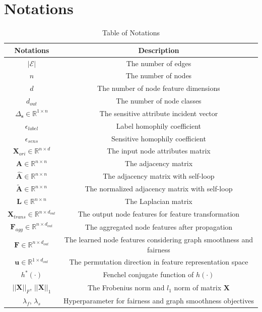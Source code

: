 \documentclass[letterpaper]{article} %
\theoremstyle{plain}
\theoremstyle{definition}
\theoremstyle{remark}
\begin{document}
\section{Notations}
\begin{table}[h]
\caption{Table of Notations}
\centering
    \begin{tabular}{ cc} 
    \toprule
    Notations & Description \\
    \hline
    $|\mathcal{E}|$ & The number of edges \\
    $n$ & The number of nodes\\
    $d$ & The number of node feature dimensions\\
    $d_{out}$ & The number of node classes\\
    $\Delta_{\mathbf{s}}\in\mathbb{R}^{1\times n}$ & The sensitive attribute incident vector \\
    $\epsilon_{label}$ & Label homophily coefficient \\
    $\epsilon_{sens}$ & Sensitive homophily coefficient \\
    $\mathbf{X}_{ori}\in\mathbb{R}^{n\times d}$ & The input node attributes matrix \\
    $\mathbf{A}\in\mathbb{R}^{n\times n}$ & The adjacency matrix\\
    $\hat{\mathbf{A}}\in\mathbb{R}^{n\times n}$ & The adjacency matrix with self-loop\\
    $\tilde{\mathbf{A}}\in\mathbb{R}^{n\times n}$ & The normalized adjacency matrix with self-loop\\
    $\mathbf{L}\in\mathbb{R}^{n\times n}$ & The Laplacian matrix\\
    $\mathbf{X}_{trans}\in\mathbb{R}^{n\times d_{out}}$ & The output node features for feature transformation \\
    $\mathbf{F}_{agg}\in\mathbb{R}^{n\times d_{out}}$ & The aggregated node features after propagation \\
    $\mathbf{F}\in\mathbb{R}^{n\times d_{out}}$ & The learned node features considering graph smoothness and fairness \\
    $\mathbf{u}\in\mathbb{R}^{1\times d_{out}}$ & The permutation direction in feature representation space \\
    $h^{*}(\cdot)$ & Fenchel conjugate function of $h(\cdot)$ \\
    $||\mathbf{X}||_F$, $||\mathbf{X}||_1$ & The Frobenius norm and $l_1$ norm of matrix $\mathbf{X}$\\
    $\lambda_f$, $\lambda_s$ & Hyperparameter for fairness and graph smoothness objectives \\
    \bottomrule 
    \end{tabular}

\end{table}
\end{document}
